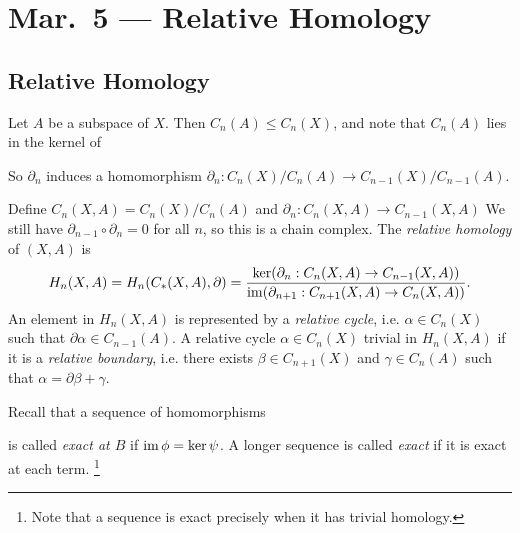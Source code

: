 \chapter{Mar.~5 --- Relative Homology}

\section{Relative Homology}
\begin{remark}
  Let $A$ be a subspace of $X$. Then $C_n(A) \le C_n(X)$,
  and note that $C_n(A)$ lies in the kernel of
  \begin{center}
  \end{center}
  So $\partial_n$ induces a homomorphism
  $\partial_n : C_n(X) / C_n(A) \to C_{n - 1}(X) / C_{n - 1}(A)$.
\end{remark}

\begin{definition}
  Define $C_n(X, A) = C_n(X) / C_n(A)$ and
  $\partial_n : C_n(X, A) \to C_{n - 1}(X, A)$
  We still have $\partial_{n - 1} \circ \partial_n = 0$
  for all $n$, so this is a chain complex.
  The \emph{relative homology} of $(X, A)$ is
  \[
    H_n(X, A)
    = H_n(C_*(X, A), \partial)
    = \frac{\ker(\partial_n : C_n(X, A) \to C_{n - 1}(X, A))}{\operatorname{im}(\partial_{n + 1} : C_{n + 1}(X, A) \to C_{n}(X, A))}.
  \]
  An element in $H_n(X, A)$ is represented by a
  \emph{relative cycle}, i.e. $\alpha \in C_n(X)$
  such that $\partial \alpha \in C_{n - 1}(A)$.
  A relative cycle $\alpha \in C_n(X)$ trivial
  in $H_n(X, A)$ if it is a \emph{relative boundary},
  i.e. there exists $\beta \in C_{n + 1}(X)$
  and $\gamma \in C_n(A)$ such that
  $\alpha = \partial \beta + \gamma$.
\end{definition}

\begin{definition}
  Recall that a sequence of homomorphisms
  \begin{center}
  \end{center}
  is called \emph{exact at $B$} if
  $\operatorname{im} \phi = \ker \psi$. A longer sequence is called
  \emph{exact} if it is exact at each term.
  \footnote{Note that a sequence is exact precisely when it has trivial homology.}
\end{definition}

